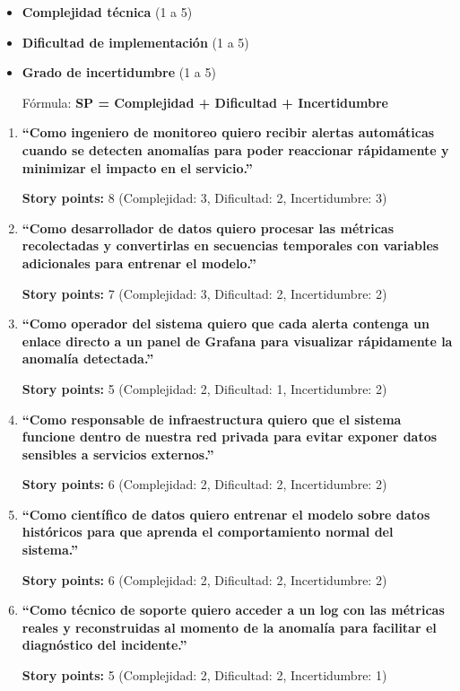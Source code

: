\documentclass[
11pt, %
]{charter}
\begin{document}
\begin{itemize}
    \item \textbf{Complejidad técnica} (1 a 5)
    \item \textbf{Dificultad de implementación} (1 a 5)
    \item \textbf{Grado de incertidumbre} (1 a 5)

 Fórmula: \textbf{SP = Complejidad + Dificultad + Incertidumbre}
\end{itemize}

\begin{enumerate}
    \item \textbf{“Como ingeniero de monitoreo quiero recibir alertas automáticas cuando se detecten anomalías para poder reaccionar rápidamente y minimizar el impacto en el servicio.”}

 \textbf{Story points:} 8 (Complejidad: 3, Dificultad: 2, Incertidumbre: 3)
    \item \textbf{“Como desarrollador de datos quiero procesar las métricas recolectadas y convertirlas en secuencias temporales con variables adicionales para entrenar el modelo.”}

 \textbf{Story points:} 7 (Complejidad: 3, Dificultad: 2, Incertidumbre: 2)
    \item \textbf{“Como operador del sistema quiero que cada alerta contenga un enlace directo a un panel de Grafana para visualizar rápidamente la anomalía detectada.”}

 \textbf{Story points:} 5 (Complejidad: 2, Dificultad: 1, Incertidumbre: 2)
    \item \textbf{“Como responsable de infraestructura quiero que el sistema funcione dentro de nuestra red privada para evitar exponer datos sensibles a servicios externos.”}

 \textbf{Story points:} 6 (Complejidad: 2, Dificultad: 2, Incertidumbre: 2)
    \item \textbf{“Como científico de datos quiero entrenar el modelo sobre datos históricos para que aprenda el comportamiento normal del sistema.”}

 \textbf{Story points:} 6 (Complejidad: 2, Dificultad: 2, Incertidumbre: 2)
    \item \textbf{“Como técnico de soporte quiero acceder a un log con las métricas reales y reconstruidas al momento de la anomalía para facilitar el diagnóstico del incidente.”}

 \textbf{Story points:} 5 (Complejidad: 2, Dificultad: 2, Incertidumbre: 1)
\end{enumerate}
\end{document}
